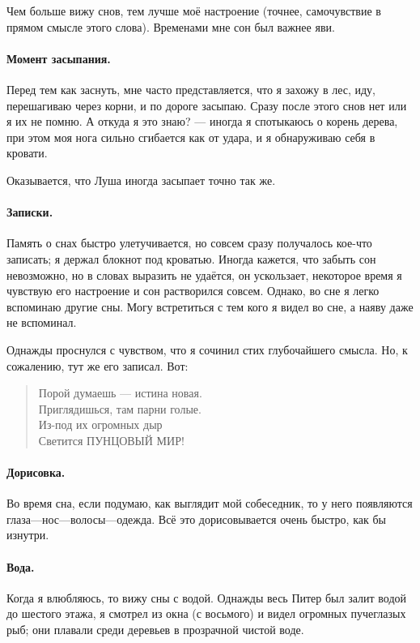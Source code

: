\documentclass{book}
\begin{document}
Чем больше вижу снов, тем лучше моё настроение (точнее, самочувствие в прямом смысле этого слова).
Временами мне сон был важнее яви.

\paragraph{Момент засыпания.}
Перед тем как заснуть, мне часто представляется, что я захожу в лес, иду, перешагиваю через корни, и по дороге засыпаю.
Сразу после этого снов нет или я их не помню.
А откуда я это знаю? --- иногда я спотыкаюсь о корень дерева, при этом моя нога сильно сгибается как от удара, и я обнаруживаю себя в кровати.

Оказывается, что Луша иногда засыпает точно так же.

\paragraph{Записки.}
Память о снах быстро улетучивается, но совсем сразу получалось кое-что записать;
я держал блокнот под кроватью.
Иногда кажется, что забыть сон невозможно, но в словах выразить не удаётся, он ускользает, некоторое время я чувствую его настроение и сон растворился совсем.
Однако, во сне я легко вспоминаю другие сны.
Могу встретиться с тем кого я видел во сне, а наяву даже не вспоминал.

Однажды проснулся с чувством, что я сочинил стих глубочайшего смысла.
Но, к сожалению, тут же его записал.
Вот:
\begin{verse}
Порой думаешь --- истина новая.\\
Приглядишься, там парни голые.\\
Из-под их огромных дыр\\
Светится ПУНЦОВЫЙ МИР!
\end{verse}

\paragraph{Дорисовка.}
Во время сна, если подумаю, как выглядит мой собеседник, то у него появляются глаза---нос---волосы---одежда.
Всё это дорисовывается очень быстро, как бы изнутри.

\paragraph{Вода.}
Когда я влюбляюсь, то вижу сны с водой.
Однажды весь Питер был залит водой до шестого этажа, я смотрел из окна (с восьмого) и видел огромных пучеглазых рыб; они плавали среди деревьев в прозрачной чистой воде.
\end{document}
